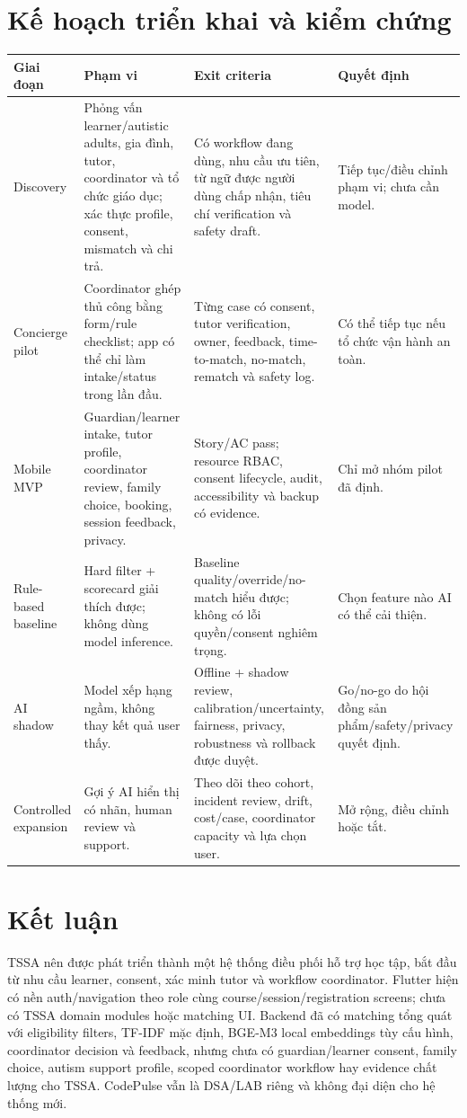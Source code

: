 \documentclass[11pt,a4paper]{article}
\begin{document}
\section{Kế hoạch triển khai và kiểm chứng}

\begin{tabularx}{\textwidth}{p{2.1cm}p{5.2cm}p{4.5cm}Y}
\toprule
\textbf{Giai đoạn} & \textbf{Phạm vi} & \textbf{Exit criteria} & \textbf{Quyết định} \\
\midrule
Discovery & Phỏng vấn learner/autistic adults, gia đình, tutor, coordinator và tổ chức giáo dục; xác thực profile, consent, mismatch và chi trả. & Có workflow đang dùng, nhu cầu ưu tiên, từ ngữ được người dùng chấp nhận, tiêu chí verification và safety draft. & Tiếp tục/điều chỉnh phạm vi; chưa cần model. \\
Concierge pilot & Coordinator ghép thủ công bằng form/rule checklist; app có thể chỉ làm intake/status trong lần đầu. & Từng case có consent, tutor verification, owner, feedback, time-to-match, no-match, rematch và safety log. & Có thể tiếp tục nếu tổ chức vận hành an toàn. \\
Mobile MVP & Guardian/learner intake, tutor profile, coordinator review, family choice, booking, session feedback, privacy. & Story/AC pass; resource RBAC, consent lifecycle, audit, accessibility và backup có evidence. & Chỉ mở nhóm pilot đã định. \\
Rule-based baseline & Hard filter + scorecard giải thích được; không dùng model inference. & Baseline quality/override/no-match hiểu được; không có lỗi quyền/consent nghiêm trọng. & Chọn feature nào AI có thể cải thiện. \\
AI shadow & Model xếp hạng ngầm, không thay kết quả user thấy. & Offline + shadow review, calibration/uncertainty, fairness, privacy, robustness và rollback được duyệt. & Go/no-go do hội đồng sản phẩm/safety/privacy quyết định. \\
Controlled expansion & Gợi ý AI hiển thị có nhãn, human review và support. & Theo dõi theo cohort, incident review, drift, cost/case, coordinator capacity và lựa chọn user. & Mở rộng, điều chỉnh hoặc tắt. \\
\bottomrule
\end{tabularx}

\section{Kết luận}

TSSA nên được phát triển thành một hệ thống điều phối hỗ trợ học tập, bắt đầu từ nhu cầu learner, consent, xác minh tutor và workflow coordinator. Flutter hiện có nền auth/navigation theo role cùng course/session/registration screens; chưa có TSSA domain modules hoặc matching UI. Backend đã có matching tổng quát với eligibility filters, TF-IDF mặc định, BGE-M3 local embeddings tùy cấu hình, coordinator decision và feedback, nhưng chưa có guardian/learner consent, family choice, autism support profile, scoped coordinator workflow hay evidence chất lượng cho TSSA. CodePulse vẫn là DSA/LAB riêng và không đại diện cho hệ thống mới.
\end{document}
